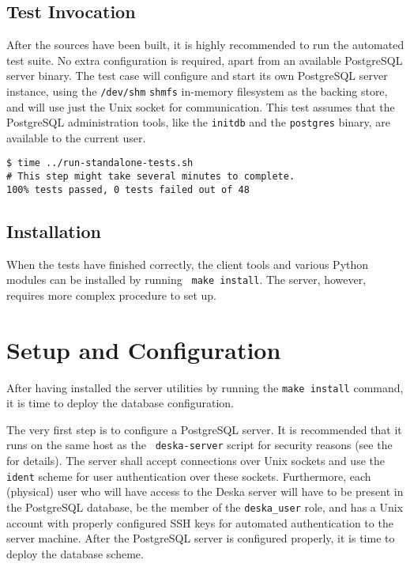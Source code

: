 \documentclass[deska]{subfiles}
\begin{document}
\subsection{Test Invocation}

After the sources have been built, it is highly recommended to run the automated test suite.  No extra configuration is
required, apart from an available PostgreSQL server binary.  The test case will configure and start its own PostgreSQL
server instance, using the {\tt /dev/shm} {\tt shmfs} in-memory filesystem as the backing store, and will use just the
Unix socket for communication.  This test assumes that the PostgreSQL administration tools, like the {\tt initdb} and
the {\tt postgres} binary, are available to the current user.

\begin{verbatim}
$ time ../run-standalone-tests.sh
# This step might take several minutes to complete.
100% tests passed, 0 tests failed out of 48
\end{verbatim}

\subsection{Installation}

When the tests have finished correctly, the client tools and various Python modules can be installed by running {\tt
make install}.  The server, however, requires more complex procedure to set up.

\section{Setup and Configuration}

After having installed the server utilities by running the {\tt make install} command, it is time to deploy the database
configuration.

The very first step is to configure a PostgreSQL server.  It is recommended that it runs on the same host as the {\tt
deska-server} script for security reasons (see the  for details).  The server shall
accept connections over Unix sockets and use the {\tt ident} scheme for user authentication over these sockets.
Furthermore, each (physical) user who will have access to the Deska server will have to be present in the PostgreSQL
database, be the member of the {\tt deska\_user} role, and has a Unix account with properly configured SSH keys for
automated authentication to the server machine.  After the PostgreSQL server is configured properly, it is time to
deploy the database scheme.
\end{document}
